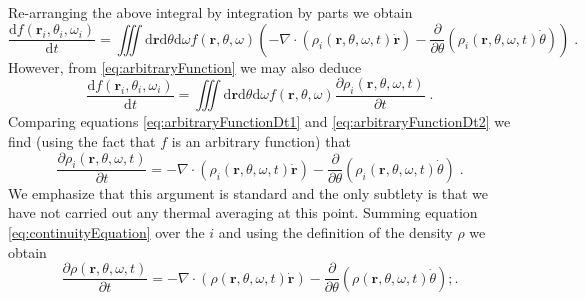 \documentclass{article}
\begin{document}
Re-arranging the above integral by integration by parts we obtain
\begin{equation}
    \label{eq:arbitraryFunctionDt1}
    \frac{\text{d}f\left( \mathbf{r}_i,\theta _i,\omega _i \right)}{\text{d}t}=\iiint{\text{d}\mathbf{r}\text{d}\theta \text{d}\omega f\left( \mathbf{r},\theta ,\omega \right) \left( -\nabla \cdot \left( \rho _i\left( \mathbf{r},\theta ,\omega ,t \right) \mathbf{\dot{r}} \right) -\frac{\partial}{\partial \theta}\left( \rho _i\left( \mathbf{r},\theta ,\omega ,t \right) \dot{\theta} \right) \right)}\;.
\end{equation}
However, from \eqref{eq:arbitraryFunction} we may also deduce
\begin{equation}
    \label{eq:arbitraryFunctionDt2}
    \frac{\text{d}f\left( \mathbf{r}_i,\theta _i,\omega _i \right)}{\text{d}t}=\iiint{\text{d}\mathbf{r}\text{d}\theta \text{d}\omega f\left( \mathbf{r},\theta ,\omega \right) \frac{\partial \rho _i\left( \mathbf{r},\theta ,\omega ,t \right)}{\partial t}}\;.
\end{equation}
Comparing equations \eqref{eq:arbitraryFunctionDt1} and \eqref{eq:arbitraryFunctionDt2} we find (using the fact that $f$ is an arbitrary function) that
\begin{equation}
    \label{eq:continuityEquation}
    \frac{\partial \rho _i\left( \mathbf{r},\theta ,\omega ,t \right)}{\partial t}=-\nabla \cdot \left( \rho _i\left( \mathbf{r},\theta ,\omega ,t \right) \mathbf{\dot{r}} \right) -\frac{\partial}{\partial \theta}\left( \rho _i\left( \mathbf{r},\theta ,\omega ,t \right) \dot{\theta} \right)\;.
\end{equation}
We emphasize that this argument is standard and the only subtlety is that we have not carried out any thermal averaging at this point. Summing equation \eqref{eq:continuityEquation} over the $i$ and using the definition of the density $\rho$ we obtain
\begin{equation}
    \frac{\partial \rho \left( \mathbf{r},\theta ,\omega ,t \right)}{\partial t}=-\nabla \cdot \left( \rho \left( \mathbf{r},\theta ,\omega ,t \right) \mathbf{\dot{r}} \right) -\frac{\partial}{\partial \theta}\left( \rho \left( \mathbf{r},\theta ,\omega ,t \right) \dot{\theta} \right);.
\end{equation}
\end{document}
